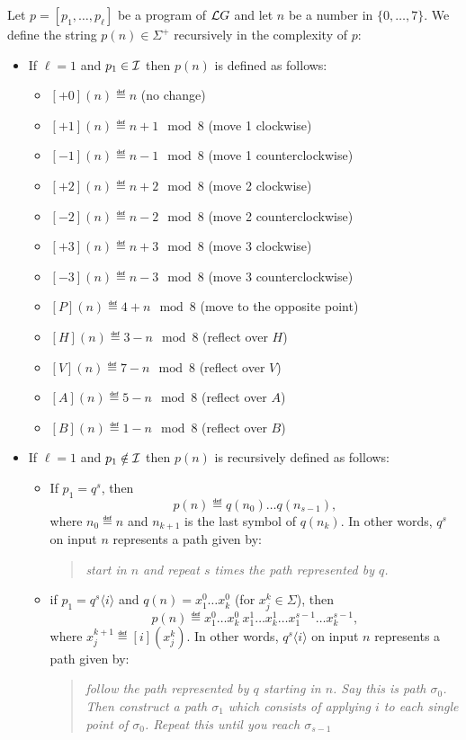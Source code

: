 Let $p=[p_1,\dots,p_\ell]$ be a program of $\mathcal{L}G$ and let $n$ be a number in $\{0,\dots,7\}$. We define the string $p(n)\in\Sigma^+$ recursively in the complexity of $p$:
\begin{itemize}
\item If $\ell=1$ and $p_1\in\mathcal{I}$ then $p(n)$ is defined as follows:
	\begin{itemize}
	\item $[+0](n)\eqdef  n$ (no change)
	\item $[+1] (n) \eqdef   n+1 \mod 8$ (move 1 clockwise)
	\item $[-1] (n) \eqdef   n-1 \mod 8$ (move 1 counterclockwise)
	\item $[+2] (n) \eqdef   n+2 \mod 8$ (move 2 clockwise)
	\item $[-2] (n) \eqdef   n-2 \mod 8$ (move 2 counterclockwise)
	\item $[+3] (n) \eqdef   n+3 \mod 8$ (move 3 clockwise)
	\item $[-3] (n) \eqdef   n-3 \mod 8$ (move 3 counterclockwise)
	\item $[P](n)\eqdef  4+n \mod 8$ (move to the opposite point)
	\item $[H](n)\eqdef  3-n \mod 8$ (reflect over $H$)
	\item $[V](n)\eqdef  7-n \mod 8$ (reflect over $V$)
	\item $[A](n)\eqdef  5-n \mod 8$ (reflect over $A$)
	\item $[B](n)\eqdef  1-n \mod 8$ (reflect over $B$)
	\end{itemize}

\item If $\ell=1$ and $p_1\notin\mathcal{I}$ then $p(n)$ is recursively defined as follows:

	\begin{itemize}
	\item If $p_1=q^s$, then
	$$
	p(n)\eqdef q(n_0)\dots q(n_{s-1}),
	$$
	where $n_0\eqdef n$ and $n_{k+1}$ is the last symbol of $q(n_k)$. In other words, $q^s$ on input $n$ represents a path given by:
	\begin{quote}\em
	start in $n$ and repeat $s$ times the path represented by $q$.
	\end{quote}
	
	\item if $p_1=q^s\langle i\rangle$ and  $q(n)=x^0_1\dots x^0_k$ (for $x^k_j\in\Sigma$), then
	$$
	p(n)\eqdef x^0_1\dots x^0_k \ x^1_1\dots x^1_k \dots x^{s-1}_1\dots x^{s-1}_k,
	$$
	where $x^{k+1}_j\eqdef [i](x^k_j)$. In other words, $q^s\langle i\rangle$ on input $n$ represents a path given by:
	\begin{quote}\em
	follow the path represented by $q$ starting in $n$. Say this is path $\sigma_0$. Then construct a path $\sigma_1$ which consists of applying $i$ to each single point of $\sigma_0$. Repeat this until you reach $\sigma_{s-1}$
	\end{quote}
	

\end{itemize}
\end{itemize}
